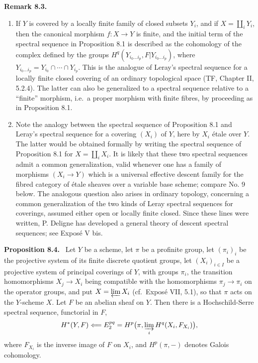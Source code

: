 \documentclass[11pt]{article}
\newcommand{\ie}{i.e.\ }
\newcommand{\cf}{cf.\ }
\newenvironment{statement}[1]{\par\medskip\noindent\textbf{#1.}\ }{\par\medskip}
\newenvironment{remarktext}[1]{\par\medskip\noindent\textbf{#1.}\ }{\par\medskip}
\begin{document}
\begin{remarktext}{Remark 8.3}
\begin{enumerate}[label=\alph*)]
\item If \(Y\) is covered by a locally finite family of closed subsets \(Y_i\), and if \(X=\coprod_iY_i\), then the canonical morphism \(f:X\to Y\) is finite, and the initial term of the spectral sequence in Proposition 8.1 is described as the cohomology of the complex defined by the groups \(H^q(Y_{i_0\ldots i_p},F|Y_{i_0\ldots i_p})\), where \(Y_{i_0\ldots i_p}=Y_{i_0}\cap\cdots\cap Y_{i_p}\). This is the analogue of Leray's spectral sequence for a locally finite closed covering of an ordinary topological space (TF, Chapter II, 5.2.4). The latter can also be generalized to a spectral sequence relative to a ``finite'' morphism, \ie a proper morphism with finite fibres, by proceeding as in Proposition 8.1.
\item Note the analogy between the spectral sequence of Proposition 8.1 and Leray's spectral sequence for a covering \((X_i)\) of \(Y\), here by \(X_i\) \'etale over \(Y\). The latter would be obtained formally by writing the spectral sequence of Proposition 8.1 for \(X=\coprod_iX_i\). It is likely that these two spectral sequences admit a common generalization, valid whenever one has a family of morphisms \((X_i\to Y)\) which is a universal effective descent family for the fibred category of \'etale sheaves over a variable base scheme; compare No. 9 below. The analogous question also arises in ordinary topology, concerning a common generalization of the two kinds of Leray spectral sequences for coverings, assumed either open or locally finite closed. Since these lines were written, P. Deligne has developed a general theory of descent spectral sequences; see Expos\'e V bis.
\end{enumerate}
\end{remarktext}

\begin{statement}{Proposition 8.4}
Let \(Y\) be a scheme, let \(\pi\) be a profinite group, let \((\pi_i)_i\) be the projective system of its finite discrete quotient groups, let \((X_i)_{i\in I}\) be a projective system of principal coverings of \(Y\), with groups \(\pi_i\), the transition homomorphisms \(X_j\to X_i\) being compatible with the homomorphisms \(\pi_j\to\pi_i\) on the operator groups, and put \(X=\varprojlim X_i\) (\cf Expos\'e VII, 5.1), so that \(\pi\) acts on the \(Y\)-scheme \(X\). Let \(F\) be an abelian sheaf on \(Y\). Then there is a Hochschild-Serre spectral sequence, functorial in \(F\),
\[
H^*(Y,F)\Longleftarrow E_2^{pq}=H^p\bigl(\pi,\varinjlim_iH^q(X_i,F_{X_i})\bigr),
\]
where \(F_{X_i}\) is the inverse image of \(F\) on \(X_i\), and \(H^p(\pi,-)\) denotes Galois cohomology.
\end{statement}
\end{document}
